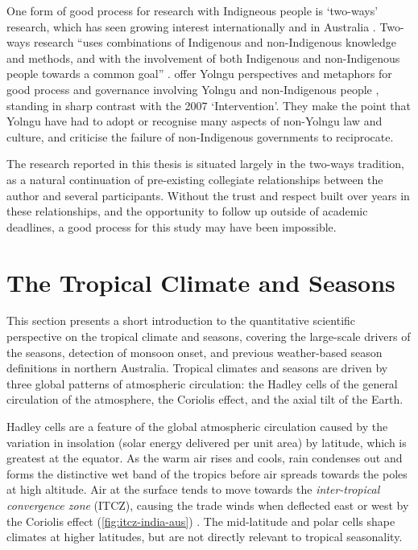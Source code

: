 One form of good process for research with Indigneous people is `two-ways'
research, which has seen growing interest internationally and in Australia
\citep{turner2009,prober2011}.  Two-ways research ``uses combinations of
Indigenous and non-Indigenous knowledge and methods, and with the involvement
of both Indigenous and non-Indigenous people towards a common goal''
\citep{ens2014}.
%
\citet{marika2009} offer Yolngu perspectives and metaphors for good process
and governance involving Yolngu and non-Indigenous people , standing in sharp
contrast with the 2007 `Intervention'.  They make the point that Yolngu have
had to adopt or recognise many aspects of non-Yolngu law and culture, and
criticise the failure of non-Indigenous governments to reciprocate.


The research reported in this thesis is situated largely in the two-ways tradition,
as a natural continuation of pre-existing collegiate relationships between
the author and several participants.  Without the
trust and respect built over years in these relationships, and the opportunity
to follow up outside of academic deadlines, a good process for this study
may have been impossible.



\section{The Tropical Climate and Seasons}
\label{sec:lit-tropical-climate}

This section presents a short introduction to the quantitative scientific
perspective on the tropical climate and seasons, covering the large-scale
drivers of the seasons, detection of monsoon onset, and previous
weather-based season definitions in northern Australia.
%
Tropical climates and seasons are driven by three global patterns of
atmospheric circulation:  the Hadley cells of the general circulation of
the atmosphere, the Coriolis effect, and the axial tilt of the Earth.

Hadley cells are a feature of the global atmospheric circulation
caused by the variation in insolation (solar energy delivered per unit area)
by latitude, which is greatest at the equator.  As the warm air rises and
cools, rain condenses out and forms the distinctive wet band of the tropics
before air spreads towards the poles at high altitude.
Air at the surface tends to move towards the \textit{inter-tropical
convergence zone} (ITCZ), causing the trade winds when deflected east or west
by the Coriolis effect (\cref{fig:itcz-india-aus}) \citep{kump2010}.
The mid-latitude and polar cells shape climates at higher
latitudes, but are not directly relevant to tropical seasonality.

